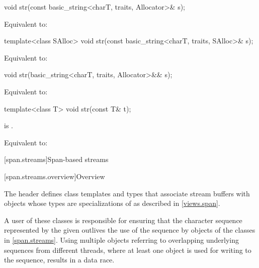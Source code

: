 %
\begin{itemdecl}
void str(const basic_string<charT, traits, Allocator>& s);
\end{itemdecl}

\begin{itemdescr}
\pnum
\effects
Equivalent to: 
\end{itemdescr}

%
\begin{itemdecl}
template<class SAlloc>
  void str(const basic_string<charT, traits, SAlloc>& s);
\end{itemdecl}

\begin{itemdescr}
\pnum
\effects
Equivalent to: 
\end{itemdescr}

%
\begin{itemdecl}
void str(basic_string<charT, traits, Allocator>&& s);
\end{itemdecl}

\begin{itemdescr}
\pnum
\effects
Equivalent to: 
\end{itemdescr}

%
\begin{itemdecl}
template<class T>
  void str(const T& t);
\end{itemdecl}

\begin{itemdescr}
\pnum
\constraints
{}
is .

\pnum
\effects
Equivalent to: 
\end{itemdescr}

[span.streams]{Span-based streams}

[span.streams.overview]{Overview}

\pnum
The header  defines class templates and types
that associate stream buffers with objects whose types are
specializations of  as described in \ref{views.span}.
\begin{note}
A user of these classes is responsible for ensuring
that the character sequence represented by the given 
outlives the use of the sequence by objects of the classes in \ref{span.streams}.
Using multiple  objects
referring to overlapping underlying sequences from different threads,
where at least one  object is used
for writing to the sequence,
results in a data race.
\end{note}

